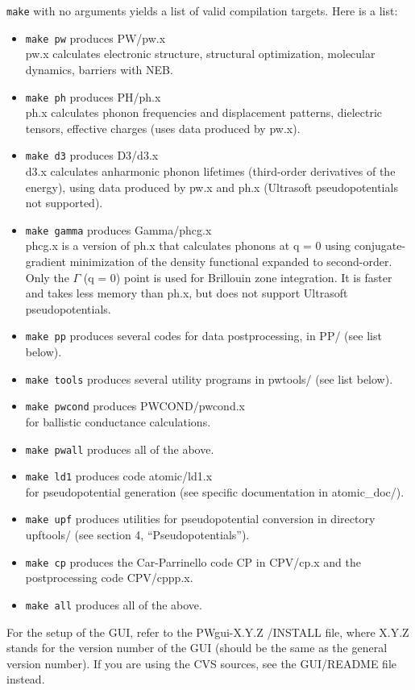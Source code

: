 \documentclass[12pt,a4paper]{article}
\begin{document}
\texttt{make} with no arguments yields a list of valid compilation targets. 
Here is a list:
\begin{itemize}
\item \texttt{make pw} produces PW/pw.x\\
pw.x calculates electronic structure, structural optimization, molecular dynamics, barriers with NEB.
\item \texttt{make ph} produces PH/ph.x\\
ph.x calculates phonon frequencies and displacement patterns,
dielectric tensors, effective charges (uses data produced by pw.x). 
\item \texttt{make d3} produces D3/d3.x\\
d3.x calculates anharmonic phonon lifetimes (third-order derivatives
of the energy), using data produced by pw.x and ph.x (Ultrasoft
pseudopotentials not supported). 
\item \texttt{make gamma} produces Gamma/phcg.x\\
phcg.x is a version of ph.x that calculates phonons at q = 0 using
conjugate-gradient minimization of the density functional expanded to
second-order. Only the $\Gamma$ (q = 0) point is used for Brillouin zone
integration. It is faster and takes less memory than ph.x, but does
not support Ultrasoft pseudopotentials. 
\item  \texttt{make pp} produces several codes for data postprocessing, in PP/
  (see list below). 
\item \texttt{make tools} produces several utility programs in pwtools/ (see
  list below).  
\item \texttt{make pwcond} produces PWCOND/pwcond.x\\
 for ballistic conductance calculations.
\item \texttt{make pwall} produces all of the above.
\item \texttt{make ld1} produces code atomic/ld1.x\\
for pseudopotential generation (see specific documentation in atomic\_doc/).
\item \texttt{make upf} produces utilities for pseudopotential conversion in
  directory upftools/ (see section 4, ``Pseudopotentials''). 
\item \texttt{make cp} produces the Car-Parrinello code CP in CPV/cp.x
  and the postprocessing code CPV/cppp.x. 
\item \texttt{make all} produces all of the above.
\end{itemize}
For the setup of the GUI, refer to the PWgui-X.Y.Z /INSTALL file, where
X.Y.Z stands for the version number of the GUI (should be the same as the
general version number). If you are using the CVS sources, see
the GUI/README file instead.
   
\end{document}
